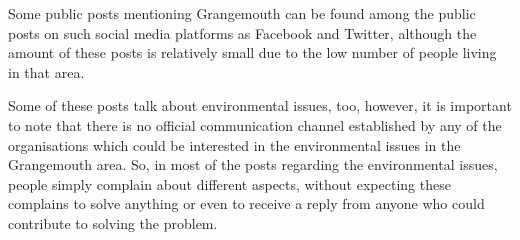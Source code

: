 Some public posts mentioning Grangemouth can be found among the public posts on such social media platforms as Facebook and Twitter, although the amount of these posts is relatively small due to the low number of people living in that area.

Some of these posts talk about environmental issues, too, however, it is important to note that there is no official communication channel established by any of the organisations which could be interested in the environmental issues in the Grangemouth area. So, in most of the posts regarding the environmental issues, people simply complain about different aspects, without expecting these complains to solve anything or even to receive a reply from anyone who could contribute to solving the problem.

\begin{figure}[t!]
 \centering
 \begin{minipage}{10cm}
     \centering
 \end{minipage}
 \hspace{0.5cm}
 \begin{minipage}{10cm}
     \centering
 \end{minipage}
 \hspace{1.3cm}
 \begin{minipage}{10cm}
     \centering

\end{minipage}
\end{figure}
